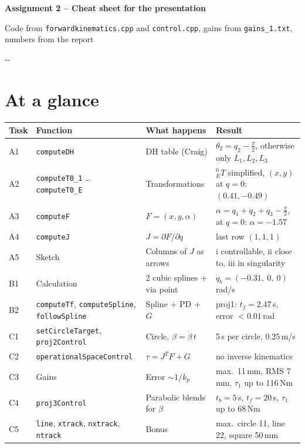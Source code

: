 \documentclass[10pt,a4paper]{article}
\makeatletter
\newcommand{\secneed}[1]{\par\penalty\@M\begingroup\setlength{\dimen@}{#1}\dimen@ii\pagegoal
  \advance\dimen@ii-\pagetotal\ifdim\dimen@>\dimen@ii\ifdim\dimen@ii>\z@\vfil\fi\penalty-\@M\fi\endgroup}
\let\oldsection\section
\renewcommand{\section}{\secneed{9\baselineskip}\oldsection}
\newcommand{\code}[1]{\texttt{#1}}
\makeatother
\begin{document}
\small

{\LARGE\bfseries Assignment 2 -- Cheat sheet for the presentation}\par
\vspace{2pt}
{\large Code from \code{forwardkinematics.cpp} and \code{control.cpp}, gains from \code{gains\_1.txt},
numbers from the report}

\section{At a glance}

{\small\setlength{\tabcolsep}{4pt}
\begin{tabular}{@{}llll@{}}
  \toprule
  Task & Function & What happens & Result \\
  \midrule
  A1 & \code{computeDH} & DH table (Craig) & $\theta_2 = q_2 - \frac{\pi}{2}$, otherwise only $L_1, L_2, L_3$ \\
  A2 & \code{computeT0\_1} \ldots{} \code{computeT0\_E} & Transformations & ${}^0_ET$ simplified, $(x, y)$ at $q = 0$: $(0.41, -0.49)$ \\
  A3 & \code{computeF} & $F = (x, y, \alpha)$ & $\alpha = q_1 + q_2 + q_3 - \frac{\pi}{2}$, at $q = 0$: $\alpha = -1.57$ \\
  A4 & \code{computeJ} & $J = \partial F / \partial q$ & last row $(1, 1, 1)$ \\
  A5 & Sketch & Columns of $J$ as arrows & i controllable, ii close to, iii in singularity \\
  B1 & Calculation & 2 cubic splines + via point & $\dot q_b = (-0.31,\ 0,\ 0)$\,rad/s \\
  B2 & \code{computeTf}, \code{computeSpline}, \code{followSpline} & Spline + PD + $G$ & proj1: $t_f = 2.47$\,s, error $< 0.01$\,rad \\
  C1 & \code{setCircleTarget}, \code{proj2Control} & Circle, $\beta = \dot\beta\,t$ & 5\,s per circle, $0.25$\,m/s \\
  C2 & \code{operationalSpaceControl} & $\tau = J^T F + G$ & no inverse kinematics \\
  C3 & Gains & Error $\sim 1/k_p$ & max.\ 11\,mm, RMS 7\,mm, $\tau_1$ up to 116\,Nm \\
  C4 & \code{proj3Control} & Parabolic blends for $\beta$ & $t_b = 5$\,s, $t_f = 20$\,s, $\tau_1$ up to 68\,Nm \\
  C5 & \code{line}, \code{xtrack}, \code{nxtrack}, \code{ntrack} & Bonus & max.\ circle 11, line 22, square 50\,mm \\
  \bottomrule
\end{tabular}
}
\end{document}
